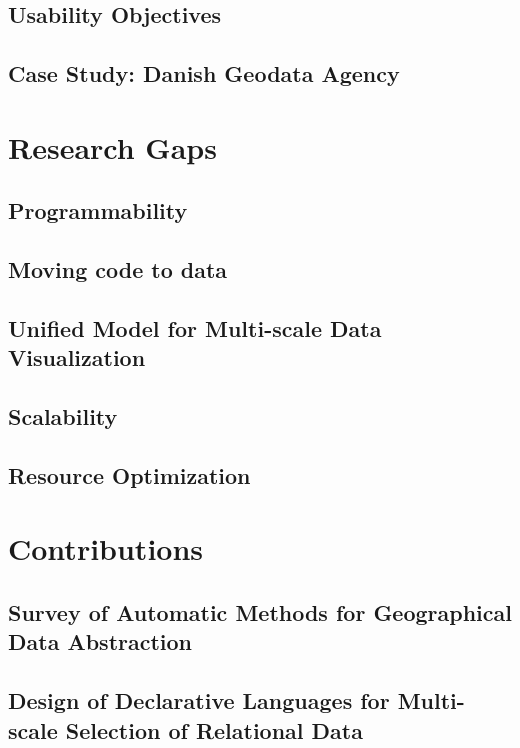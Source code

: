 \documentclass[11pt, oneside]{report}   	%
\begin{document}
\subsection{Usability Objectives}
\subsection{Case Study: Danish Geodata Agency}

\section{Research Gaps}
\subsection{Programmability}
\subsection{Moving code to data}
\subsection{Unified Model for Multi-scale Data Visualization}
\subsection{Scalability}
\subsection{Resource Optimization}


\section{Contributions}
\subsection{Survey of Automatic Methods for Geographical Data Abstraction}
\subsection{Design of Declarative Languages for Multi-scale Selection of Relational Data}
\end{document}
